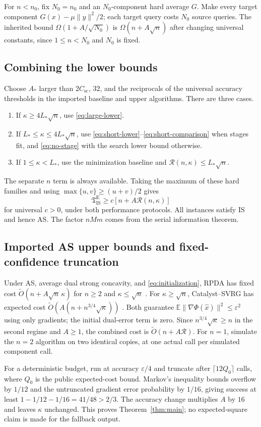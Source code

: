 \documentclass[11pt,letterpaper]{article}
\theoremstyle{definition}
\theoremstyle{remark}
\newcommand{\E}{\mathbb E}
\newcommand{\cR}{\mathcal R}
\newcommand{\T}{\mathfrak T}
\begin{document}
For $n<n_0$, fix $N_0=n_0$ and an $N_0$-component hard average $G$.
Make every target component $G(x)-\mu\|y\|^2/2$; each target query costs
$N_0$ source queries. The inherited bound
$\Omega(1+A/\sqrt{N_0})$ is $\Omega(n+A\sqrt n)$ after changing universal
constants, since $1\le n<N_0$ and $N_0$ is fixed.

\subsection{Combining the lower bounds}
\label{sec:combine-lower}

Choose $A_*$ larger than $2C_{\mathrm{sc}}$, $32$, and the reciprocals of
the universal accuracy thresholds in the imported baseline and upper
algorithms. There are three cases.
\begin{enumerate}[label=(\roman*)]
 \item If $\kappa\ge4L_*\sqrt n$, use \eqref{eq:large-lower}.
 \item If $L_*\le\kappa\le4L_*\sqrt n$, use
 \eqref{eq:short-lower}--\eqref{eq:short-comparison} when stages fit, and
 \eqref{eq:no-stage} with the search lower bound otherwise.
 \item If $1\le\kappa<L_*$, use the minimization baseline and
 $\cR(n,\kappa)\le L_*\sqrt n$.
\end{enumerate}
The separate $n$ term is always available. Taking the maximum of these
hard families and using $\max\{u,v\}\ge(u+v)/2$ gives
\[
 \T^{\mathrm E}_{\mathrm{IS}}\ge c[n+A\cR(n,\kappa)]
\]
for universal $c>0$, under both performance protocols. All instances satisfy
IS and hence AS. The factor $nMm$ comes from the serial information theorem.

\subsection{Imported AS upper bounds and fixed-confidence truncation}
\label{sec:upper-interfaces}

Under AS, average dual strong concavity, and \eqref{eq:initialization},
RPDA has fixed cost $\widetilde O(n+A\sqrt n\,\kappa)$ for $n\ge2$ and
$\kappa\le\sqrt n$ \citep[Theorem 3 and Appendix H]{zhou2026}.
For $\kappa\ge\sqrt n$, Catalyst--SVRG has expected cost
$\widetilde O(A(n+n^{3/4}\sqrt\kappa))$
\citep[Theorem 4.1, Corollary 4.1, and Section 4.2]{zhang2021}.
Both guarantee $\E\|\nabla\Phi(\widehat x)\|^2\le\varepsilon^2$ using
only gradients; the initial dual-error term is zero.
Since $n^{3/4}\sqrt\kappa\ge n$ in the second regime and $A\ge1$, the
combined cost is $\widetilde O(n+A\cR)$.
For $n=1$, simulate the $n=2$ algorithm on two identical copies,
at one actual call per simulated component call.

For a deterministic budget, run at accuracy $\varepsilon/4$ and truncate
after $\lceil12Q_0\rceil$ calls, where $Q_0$ is the public expected-cost
bound. Markov's inequality bounds overflow by $1/12$ and the untruncated
gradient error probability by $1/16$, giving success at least
$1-1/12-1/16=41/48>2/3$. The accuracy change multiplies $A$ by $16$
and leaves $\kappa$ unchanged. This proves Theorem~\ref{thm:main}; no
expected-square claim is made for the fallback output.
\end{document}
